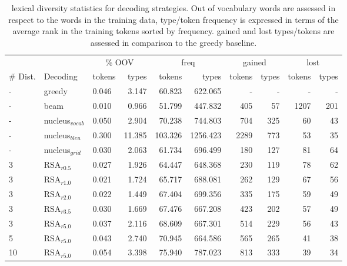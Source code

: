 \documentclass[11pt,a4paper]{article}
\begin{document}
\begin{table*}
\centering
\small
\begin{tabular}{lllrrrrrrr}
\toprule
{} & {} & \multicolumn{2}{c}{\% OOV} & \multicolumn{2}{c}{freq} & \multicolumn{2}{c}{gained} & \multicolumn{2}{c}{lost} \\
{\# Dist.} & {Decoding} &  tokens &  types &  tokens &  types &  tokens &  types &  tokens &  types \\
\midrule
- & greedy        &         0.046 &        3.147 &       60.823 &     622.065 &              - &             - &            - &           - \\
- & beam          &         0.010 &        0.966 &       51.799 &     447.832 &            405 &            57 &         1207 &         201 \\
- & nucleus$_{vocab}$ &         0.050 &        2.904 &       70.238 &     744.803 &            704 &           325 &           60 &          43 \\
- & nucleus$_{bleu}$  &         0.300 &       11.385 &      103.326 &    1256.423 &           2289 &           773 &           53 &          35 \\
- & nucleus$_{grid}$  &         0.030 &        2.063 &       61.734 &     696.499 &            180 &           127 &           81 &          64 \\
3 & RSA$_{r0.5}$       &         0.027 &        1.926 &       64.447 &     648.368 &            230 &           119 &           78 &          62 \\
3 & RSA$_{r1.0}$       &         0.021 &        1.724 &       65.717 &     688.081 &            262 &           129 &           67 &          56 \\
3 & RSA$_{r2.0}$       &         0.022 &        1.449 &       67.404 &     699.356 &            335 &           175 &           59 &          49 \\
3 & RSA$_{r3.5}$       &         0.030 &        1.669 &       67.476 &     667.208 &            423 &           202 &           57 &          49 \\
3 & RSA$_{r5.0}$       &         0.037 &        2.116 &       68.609 &     667.301 &            514 &           229 &           56 &          43 \\
5 & RSA$_{r5.0}$       &         0.043 &        2.740 &       70.945 &     664.586 &            565 &           265 &           41 &          38 \\
10 & RSA$_{r5.0}$      &         0.054 &        3.398 &       75.940 &     787.023 &            813 &           333 &           39 &          34 \\
\bottomrule
\end{tabular}
\caption{lexical diversity statistics for decoding strategies. Out of vocabulary words are assessed in respect to the words in the training data, type/token frequency is expressed in terms of the average rank in the training tokens sorted by frequency. gained and lost types/tokens are assessed in comparison to the greedy baseline.}
\end{table*}
\end{document}
